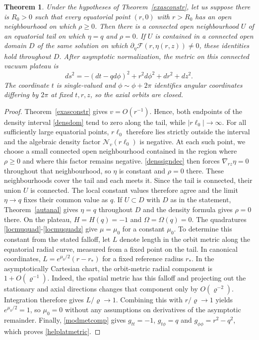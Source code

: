 \documentclass[amsmath,amsfonts,amssymb,aps,pra,superscriptaddress,10pt]{revtex4-2}
\numberwithin{equation}{section}
\theoremstyle{plain}
\newtheorem{theorem}{Theorem}
\theoremstyle{definition}
\theoremstyle{remark}
\theoremstyle{definition}
\newcommand{\ellzero}{\ell_0}
\newcommand{\gradRZ}{\nabla_{rz}}
\begin{document}
\begin{theorem}\label{evhelicplat}
Under the hypotheses of Theorem~\ref{exasconstr}, let us suppose there is $R_0>0$ such that every equatorial point $(r,0)$ with $r>R_0$ has an open neighbourhood on which $\rho\geq 0$. Then there is a connected open neighbourhood $U$ of an equatorial tail on which $\eta=q$ and $\rho=0$. If $U$ is contained in a connected open domain $D$ of the same solution on which $\partial_\eta\mathcal{F}(r,\eta(r,z))\neq 0$, these identities hold throughout $D$. After asymptotic normalization, the metric on this connected vacuum plateau is
\begin{equation}\label{helplatmetric}
ds^2=-(dt-q d\phi)^2+r^2d\phi^2+dr^2+dz^2.
\end{equation}
The coordinate $t$ is single-valued and $\phi\sim\phi+2\pi$ identifies angular coordinates differing by $2\pi$ at fixed $t,r,z$, so the axial orbits are closed.
\end{theorem}

\begin{proof}
Theorem~\ref{exasconstr} gives $v=O(r^{-1})$. Hence, both endpoints of the density interval \eqref{densdom} tend to zero along the tail, while $|r\ellzero|\to\infty$. For all sufficiently large equatorial points, $r\ellzero$ therefore lies strictly outside the interval and the algebraic density factor $\mathcal{N}_v(r\ellzero)$ is negative. At each such point, we choose a small connected open neighbourhood contained in the region where $\rho\geq 0$ and where this factor remains negative. \eqref{denssigndec} then forces $\gradRZ\eta=0$ throughout that neighbourhood, so $\eta$ is constant and $\rho=0$ there. These neighbourhoods cover the tail and each meets it. Since the tail is connected, their union $U$ is connected. The local constant values therefore agree and the limit $\eta\to q$ fixes their common value as $q$. If $U\subset D$ with $D$ as in the statement, Theorem~\ref{autanal} gives $\eta=q$ throughout $D$ and the density formula gives $\rho=0$ there. On the plateau, $H=H(q)=-1$ and $\Omega=\Omega(q)=0$. The quadratures \eqref{locmuquad}-\eqref{locmuquadz} give $\mu=\mu_0$ for a constant $\mu_0$. To determine this constant from the stated falloff, let $L$ denote length in the orbit metric along the equatorial radial curve, measured from a fixed point on the tail. In canonical coordinates, $L=e^{\mu_0/2}(r-r_*)$ for a fixed reference radius $r_*$. In the asymptotically Cartesian chart, the orbit-metric radial component is $1+O(\varrho^{-1})$. Indeed, the spatial metric has this falloff and projecting out the stationary and axial directions changes that component only by $O(\varrho^{-2})$. Integration therefore gives $L/\varrho\to 1$. Combining this with $r/\varrho\to 1$ yields $e^{\mu_0/2}=1$, so $\mu_0=0$ without any assumptions on derivatives of the asymptotic remainder. Finally, \eqref{modmetcomp} gives $g_{tt}=-1$, $g_{t\phi}=q$ and $g_{\phi\phi}=r^2-q^2$, which proves \eqref{helplatmetric}.
\end{proof}
\end{document}
